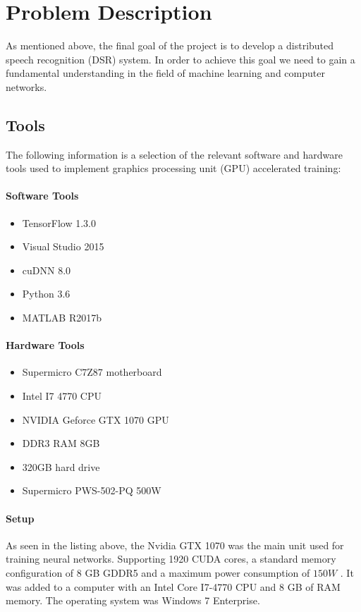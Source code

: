 \chapter{Problem Description}\label{ch:problem_description}
As mentioned above, the final goal of the project is to develop a distributed speech recognition (DSR) system.
In order to achieve this goal we need to gain a fundamental understanding in the field of machine learning and computer networks.

\section{Tools}
The following information is a selection of the relevant software and hardware tools used to implement graphics processing unit (GPU) accelerated training:

\subsubsection{Software Tools}
\begin{itemize}
    \item TensorFlow 1.3.0
    \item Visual Studio 2015
    \item cuDNN 8.0
    \item Python 3.6
    \item MATLAB R2017b
\end{itemize}

\subsubsection{Hardware Tools}
\begin{itemize}
    \item Supermicro C7Z87 motherboard
    \item Intel I7 4770 CPU
    \item NVIDIA Geforce GTX 1070 GPU
    \item DDR3 RAM 8GB
    \item 320GB hard drive
    \item Supermicro PWS-502-PQ 500W
\end{itemize}

\subsubsection{Setup}
As seen in the listing above, the Nvidia GTX 1070 was the main unit used for training neural networks.
Supporting 1920 CUDA cores, a standard memory configuration of 8 GB GDDR5 and a maximum power consumption of $150W$ \cite{GPU}. It was added to a computer with an Intel Core I7-4770 CPU and 8 GB of RAM memory. The operating system was Windows 7 Enterprise.

